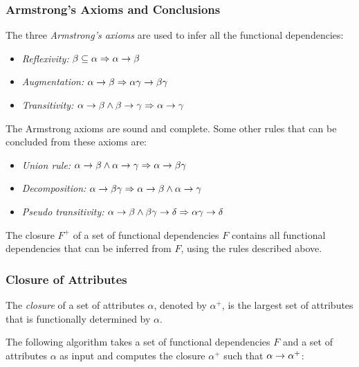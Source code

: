 \subsubsection{Armstrong's Axioms and Conclusions}
\label{armstrongs_axioms}

The three \emph{Armstrong's axioms} are used to infer all the functional dependencies:
\begin{itemize}
\item \emph{Reflexivity:} $\beta \subseteq \alpha \Rightarrow \alpha \rightarrow \beta$
\item \emph{Augmentation:} $\alpha \rightarrow \beta \Rightarrow \alpha\gamma \rightarrow \beta\gamma$
\item \emph{Transitivity:} $\alpha \rightarrow \beta \wedge \beta \rightarrow \gamma \Rightarrow \alpha \rightarrow \gamma$
\end{itemize}

The Armstrong axioms are sound and complete. Some other rules that can be concluded from these axioms are:
\begin{itemize}
\item \emph{Union rule:} $\alpha \rightarrow \beta \wedge \alpha \rightarrow \gamma \Rightarrow \alpha \rightarrow \beta\gamma$
\item \emph{Decomposition:} $\alpha \rightarrow \beta\gamma \Rightarrow \alpha \rightarrow \beta \wedge \alpha \rightarrow \gamma$
\item \emph{Pseudo transitivity:} $\alpha \rightarrow \beta \wedge \beta\gamma \rightarrow \delta \Rightarrow \alpha\gamma \rightarrow \delta$
\end{itemize}

\begin{note}
The closure $F^+$ of a set of functional dependencies $F$ contains all functional dependencies that can be inferred from $F$, using the rules described above.
\end{note}




\subsubsection{Closure of Attributes}

The \emph{closure} of a set of attributes $\alpha$, denoted by $\alpha^+$, is the largest set of attributes that is functionally determined by $\alpha$.

The following algorithm takes a set of functional dependencies $F$ and a set of attributes $\alpha$ as input and computes the closure $\alpha^+$ such that $\alpha \rightarrow \alpha^+$:

